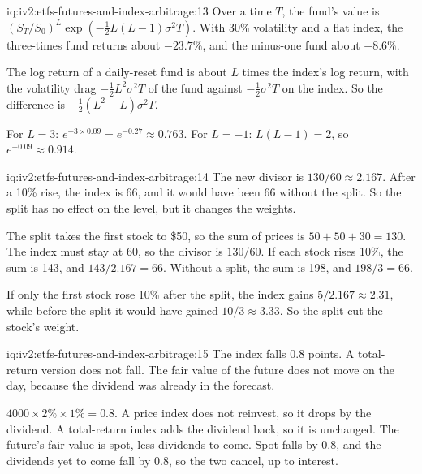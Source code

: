 \begin{solution}{iq:iv2:etfs-futures-and-index-arbitrage:13}
Over a time $T$, the fund's value is $(S_T/S_0)^L\exp\left(-\tfrac12L(L - 1)\sigma^2T\right)$. With 30\% volatility and a flat index, the three-times fund returns about $-23.7\%$, and the minus-one fund about $-8.6\%$.

The log return of a daily-reset fund is about $L$ times the index's log return, with the volatility drag $-\tfrac12L^2\sigma^2T$ of the fund against $-\tfrac12\sigma^2T$ on the index. So the difference is $-\tfrac12(L^2 - L)\sigma^2T$.

For $L = 3$: $e^{-3 \times 0.09} = e^{-0.27} \approx 0.763$. For $L = -1$: $L(L - 1) = 2$, so $e^{-0.09} \approx 0.914$.

\end{solution}

\begin{solution}{iq:iv2:etfs-futures-and-index-arbitrage:14}
The new divisor is $130/60 \approx 2.167$. After a 10\% rise, the index is 66, and it would have been 66 without the split. So the split has no effect on the level, but it changes the weights.

The split takes the first stock to \$50, so the sum of prices is $50 + 50 + 30 = 130$. The index must stay at 60, so the divisor is $130/60$. If each stock rises 10\%, the sum is 143, and $143/2.167 = 66$. Without a split, the sum is 198, and $198/3 = 66$.

If only the first stock rose 10\% after the split, the index gains $5/2.167 \approx 2.31$, while before the split it would have gained $10/3 \approx 3.33$. So the split cut the stock's weight.

\end{solution}

\begin{solution}{iq:iv2:etfs-futures-and-index-arbitrage:15}
The index falls 0.8 points. A total-return version does not fall. The fair value of the future does not move on the day, because the dividend was already in the forecast.

$4000 \times 2\% \times 1\% = 0.8$. A price index does not reinvest, so it drops by the dividend. A total-return index adds the dividend back, so it is unchanged. The future's fair value is spot, less dividends to come. Spot falls by 0.8, and the dividends yet to come fall by 0.8, so the two cancel, up to interest.

\end{solution}

